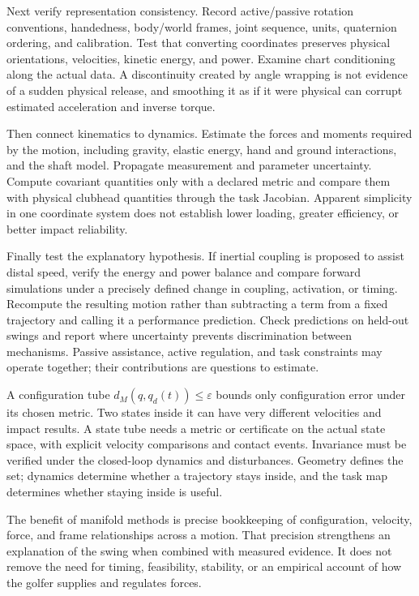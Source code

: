\documentclass[12pt, openany]{book}
\theoremstyle{plain}
\begin{document}
Next verify representation consistency. Record active/passive rotation
conventions, handedness, body/world frames, joint sequence, units, quaternion
ordering, and calibration. Test that converting coordinates preserves physical
orientations, velocities, kinetic energy, and power. Examine chart conditioning
along the actual data. A discontinuity created by angle wrapping is not
evidence of a sudden physical release, and smoothing it as if it were physical
can corrupt estimated acceleration and inverse torque.

Then connect kinematics to dynamics. Estimate the forces and moments required
by the motion, including gravity, elastic energy, hand and ground interactions,
and the shaft model. Propagate measurement and parameter uncertainty. Compute
covariant quantities only with a declared metric and compare them with physical
clubhead quantities through the task Jacobian. Apparent simplicity in one
coordinate system does not establish lower loading, greater efficiency, or
better impact reliability.

Finally test the explanatory hypothesis. If inertial coupling is proposed to
assist distal speed, verify the energy and power balance and compare forward
simulations under a precisely defined change in coupling, activation, or timing.
Recompute the resulting motion rather than subtracting a term from a fixed
trajectory and calling it a performance prediction. Check predictions on
held-out swings and report where uncertainty prevents discrimination between
mechanisms. Passive assistance, active regulation, and task constraints may
operate together; their contributions are questions to estimate.

A configuration tube $d_M(q,q_d(t))\leq\varepsilon$ bounds only configuration
error under its chosen metric. Two states inside it can have very different
velocities and impact results. A state tube needs a metric or certificate on
the actual state space, with explicit velocity comparisons and contact events.
Invariance must be verified under the closed-loop dynamics and disturbances.
Geometry defines the set; dynamics determine whether a trajectory stays inside,
and the task map determines whether staying inside is useful.

The benefit of manifold methods is precise bookkeeping of configuration,
velocity, force, and frame relationships across a motion. That precision
strengthens an explanation of the swing when combined with measured evidence.
It does not remove the need for timing, feasibility, stability, or an empirical
account of how the golfer supplies and regulates forces.
\end{document}

